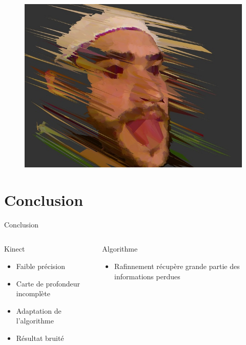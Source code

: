 \documentclass[compress,pdf,11pt,xcolor=dvipsnames]{beamer}
\begin{document}
\begin{frame}{}
\begin{figure}[ht!]
  \begin{center}
    \includegraphics[width=\textwidth]{img/f9_plain}
  \end{center}
\end{figure}


\end{frame}{}


\section{Conclusion}

\begin{frame}{Conclusion}
  
  \begin{columns}
    \begin{column}{0.5\textwidth}
     
      \begin{beamerboxesrounded}[shadow=true]{Kinect}
        \begin{itemize}
        \item Faible précision
        \item Carte de profondeur incomplète
        \item Adaptation de l'algorithme
        \item Résultat bruité
        \end{itemize}
      \end{beamerboxesrounded}
    \end{column}    
    
    \begin{column}{0.5\textwidth}
      \begin{exampleblock}{Algorithme}
        \begin{itemize}
        \item Rafinnement récupère grande partie des informations perdues
        \end{itemize}
      \end{exampleblock}

    \end{column}    
  \end{columns}    
  
\end{frame}
\end{document}
